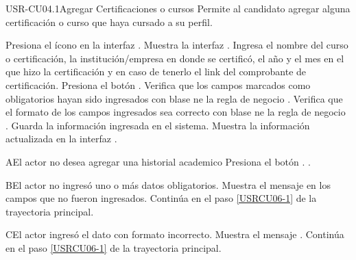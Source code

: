 \begin{UseCase}[]{USR-CU04.1}{Agregar Certificaciones o cursos}{
	Permite al candidato agregar alguna certificación o curso  que haya cursado a su perfil.
}
\end{UseCase}

\begin{UCtrayectoria}
	\UCpaso [\UCactor] Presiona el ícono \IUAgregar{} en la interfaz .
	\UCpaso Muestra la interfaz .
	\UCpaso [\UCsist] \label{USRCU06-1} Ingresa el nombre del curso o certificación, la institución/empresa en donde se certificó, el año y el mes en el que hizo la certificación y en caso de tenerlo el link del comprobante de certificación.
	\UCpaso [\UCsist] Presiona el botón .
	\UCpaso Verifica que los campos marcados como obligatorios hayan sido ingresados con blase ne la regla de negocio .
	\UCpaso Verifica que el formato de los campos ingresados sea correcto con blase ne la regla de negocio .
	\UCpaso Guarda la información ingresada en el sistema.
	\UCpaso Muestra la información actualizada en la interfaz . 
\end{UCtrayectoria}

\begin{UCtrayectoriaA}{A}{El actor no desea agregar una historial academico}
	\UCpaso [\UCsist] Presiona el botón .
	.
\end{UCtrayectoriaA} 

\begin{UCtrayectoriaA}{B}{El actor no ingresó uno o más datos obligatorios.}
	\UCpaso [\UCsist] Muestra el mensaje  en los campos que no fueron ingresados.
	\UCpaso [\UCsist] Continúa en el paso \ref{USRCU06-1} de la trayectoria principal.
\end{UCtrayectoriaA} 

\begin{UCtrayectoriaA}{C}{El actor ingresó el dato con formato incorrecto.}
	\UCpaso [\UCsist] Muestra el mensaje .
	\UCpaso [\UCsist] Continúa en el paso \ref{USRCU06-1} de la trayectoria principal.
\end{UCtrayectoriaA}




